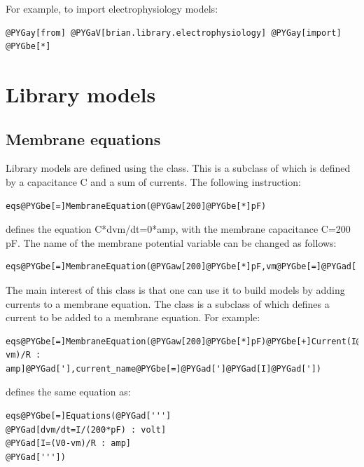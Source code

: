 \documentclass[letterpaper,10pt]{manual}
\begin{document}
For example, to import electrophysiology models:

\begin{Verbatim}[commandchars=@\[\]]
@PYGay[from] @PYGaV[brian.library.electrophysiology] @PYGay[import] @PYGbe[*]
\end{Verbatim}

\resetcurrentobjects


\section{Library models}


\subsection{Membrane equations}

Library models are defined using the  class. This is a subclass of
\hyperlink{brian.Equations}{} which is defined by a capacitance C and a sum of currents. The following instruction:

\begin{Verbatim}[commandchars=@\[\]]
eqs@PYGbe[=]MembraneEquation(@PYGaw[200]@PYGbe[*]pF)
\end{Verbatim}

defines the equation C*dvm/dt=0*amp, with the membrane capacitance C=200 pF. The name of the membrane potential
variable can be changed as follows:

\begin{Verbatim}[commandchars=@\[\]]
eqs@PYGbe[=]MembraneEquation(@PYGaw[200]@PYGbe[*]pF,vm@PYGbe[=]@PYGad[']@PYGad[V]@PYGad['])
\end{Verbatim}

The main interest of this class is that one can use it to build models by adding currents to a membrane
equation. The  class is a subclass of \hyperlink{brian.Equations}{} which defines a current to be added
to a membrane equation. For example:

\begin{Verbatim}[commandchars=@\[\]]
eqs@PYGbe[=]MembraneEquation(@PYGaw[200]@PYGbe[*]pF)@PYGbe[+]Current(I@PYGbe[=]@PYGad[']@PYGad[(V0-vm)/R : amp]@PYGad['],current_name@PYGbe[=]@PYGad[']@PYGad[I]@PYGad['])
\end{Verbatim}

defines the same equation as:

\begin{Verbatim}[commandchars=@\[\]]
eqs@PYGbe[=]Equations(@PYGad[''']
@PYGad[dvm/dt=I/(200*pF) : volt]
@PYGad[I=(V0-vm)/R : amp]
@PYGad['''])
\end{Verbatim}
\end{document}
